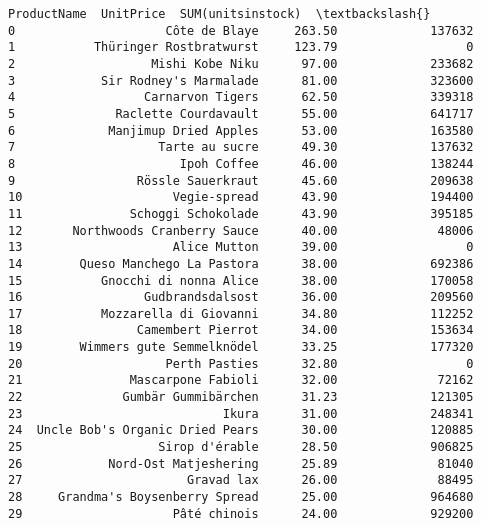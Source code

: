 \documentclass[11pt]{article}
\makeatletter
\newcommand{\boxspacing}{\kern\kvtcb@left@rule\kern\kvtcb@boxsep}
\newcommand{\prompt}[4]{
        {\ttfamily\llap{{\color{#2}[#3]:\hspace{3pt}#4}}\vspace{-\baselineskip}}
    }
\makeatother
\begin{document}
            \begin{tcolorbox}[breakable, size=fbox, boxrule=.5pt, pad at break*=1mm, opacityfill=0]
\prompt{Out}{outcolor}{35}{\boxspacing}
\begin{Verbatim}[commandchars=\\\{\}]
                        ProductName  UnitPrice  SUM(unitsinstock)  \textbackslash{}
0                     Côte de Blaye     263.50             137632
1           Thüringer Rostbratwurst     123.79                  0
2                   Mishi Kobe Niku      97.00             233682
3            Sir Rodney's Marmalade      81.00             323600
4                  Carnarvon Tigers      62.50             339318
5              Raclette Courdavault      55.00             641717
6             Manjimup Dried Apples      53.00             163580
7                    Tarte au sucre      49.30             137632
8                       Ipoh Coffee      46.00             138244
9                 Rössle Sauerkraut      45.60             209638
10                     Vegie-spread      43.90             194400
11               Schoggi Schokolade      43.90             395185
12       Northwoods Cranberry Sauce      40.00              48006
13                     Alice Mutton      39.00                  0
14        Queso Manchego La Pastora      38.00             692386
15           Gnocchi di nonna Alice      38.00             170058
16                 Gudbrandsdalsost      36.00             209560
17           Mozzarella di Giovanni      34.80             112252
18                Camembert Pierrot      34.00             153634
19        Wimmers gute Semmelknödel      33.25             177320
20                    Perth Pasties      32.80                  0
21               Mascarpone Fabioli      32.00              72162
22              Gumbär Gummibärchen      31.23             121305
23                            Ikura      31.00             248341
24  Uncle Bob's Organic Dried Pears      30.00             120885
25                   Sirop d'érable      28.50             906825
26            Nord-Ost Matjeshering      25.89              81040
27                       Gravad lax      26.00              88495
28     Grandma's Boysenberry Spread      25.00             964680
29                     Pâté chinois      24.00             929200


\end{Verbatim}
\end{tcolorbox}
\end{document}
